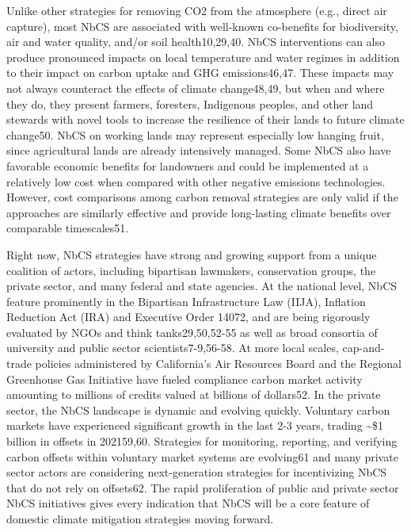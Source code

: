 \documentclass[
  letterpaper,
  DIV=11,
  numbers=noendperiod]{scrreprt}
\begin{document}
Unlike other strategies for removing CO2 from the atmosphere (e.g.,
direct air capture), most NbCS are associated with well-known
co-benefits for biodiversity, air and water quality, and/or soil
health10,29,40. NbCS interventions can also produce pronounced impacts
on local temperature and water regimes in addition to their impact on
carbon uptake and GHG emissions46,47. These impacts may not always
counteract the effects of climate change48,49, but when and where they
do, they present farmers, foresters, Indigenous peoples, and other land
stewards with novel tools to increase the resilience of their lands to
future climate change50. NbCS on working lands may represent especially
low hanging fruit, since agricultural lands are already intensively
managed. Some NbCS also have favorable economic benefits for landowners
and could be implemented at a relatively low cost when compared with
other negative emissions technologies. However, cost comparisons among
carbon removal strategies are only valid if the approaches are similarly
effective and provide long-lasting climate benefits over comparable
timescales51.

Right now, NbCS strategies have strong and growing support from a unique
coalition of actors, including bipartisan lawmakers, conservation
groups, the private sector, and many federal and state agencies. At the
national level, NbCS feature prominently in the Bipartisan
Infrastructure Law (IIJA), Inflation Reduction Act (IRA) and Executive
Order 14072, and are being rigorously evaluated by NGOs and think
tanks29,50,52-55 as well as broad consortia of university and public
sector scientists7-9,56-58. At more local scales, cap-and-trade policies
administered by California's Air Resources Board and the Regional
Greenhouse Gas Initiative have fueled compliance carbon market activity
amounting to millions of credits valued at billions of dollars52. In the
private sector, the NbCS landscape is dynamic and evolving quickly.
Voluntary carbon markets have experienced significant growth in the last
2-3 years, trading \textasciitilde\$1 billion in offsets in 202159,60.
Strategies for monitoring, reporting, and verifying carbon offsets
within voluntary market systems are evolving61 and many private sector
actors are considering next-generation strategies for incentivizing NbCS
that do not rely on offsets62. The rapid proliferation of public and
private sector NbCS initiatives gives every indication that NbCS will be
a core feature of domestic climate mitigation strategies moving forward.
\end{document}
